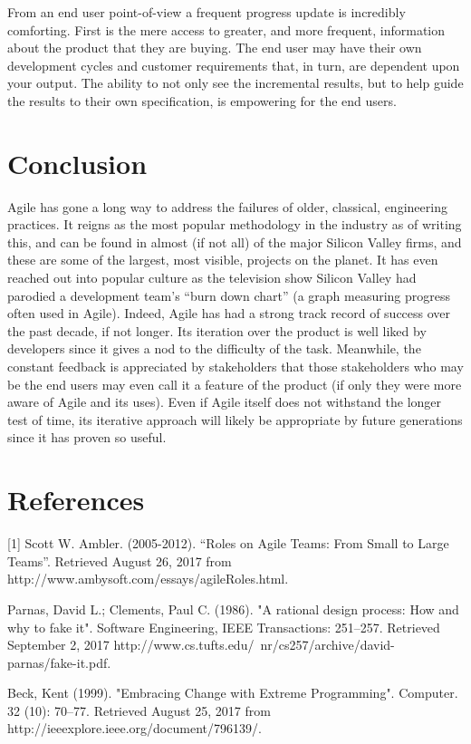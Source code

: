 \documentclass{report}
\begin{document}
  From an end user point-of-view a frequent progress update is incredibly comforting. First is the mere access to greater, and more frequent, information about the product that they are buying. The end user may have their own development cycles and customer requirements that, in turn, are dependent upon your output. The ability to not only see the incremental results, but to help guide the results to their own specification, is empowering for the end users.

\section{Conclusion}
Agile has gone a long way to address the failures of older, classical, engineering practices. It reigns as the most popular methodology in the industry as of writing this, and can be found in almost (if not all) of the major Silicon Valley firms, and these are some of the largest, most visible, projects on the planet. It has even reached out into popular culture as the television show Silicon Valley had parodied a development team’s “burn down chart” (a graph measuring progress often used in Agile). Indeed, Agile has had a strong track record of success over the past decade, if not longer. Its iteration over the product is well liked by developers since it gives a nod to the difficulty of the task. Meanwhile, the constant feedback is appreciated by stakeholders that those stakeholders who may be the end users may even call it a feature of the product (if only they were more aware of Agile and its uses). Even if Agile itself does not withstand the longer test of time, its iterative approach will likely be appropriate by future generations since it has proven so useful.

\section*{References}
[1]  Scott W. Ambler. (2005-2012). “Roles on Agile Teams: From Small to Large Teams”.
 Retrieved August 26, 2017 from http://www.ambysoft.com/essays/agileRoles.html.

\noindent[2] Parnas, David L.; Clements, Paul C. (1986). "A rational design process: How and why to fake it". Software Engineering, IEEE Transactions: 251–257. Retrieved September 2, 2017 http://www.cs.tufts.edu/~nr/cs257/archive/david-parnas/fake-it.pdf.

\noindent[3] Beck, Kent (1999). "Embracing Change with Extreme Programming". Computer. 32 (10): 70–77. Retrieved August 25, 2017 from http://ieeexplore.ieee.org/document/796139/.
\end{document}
